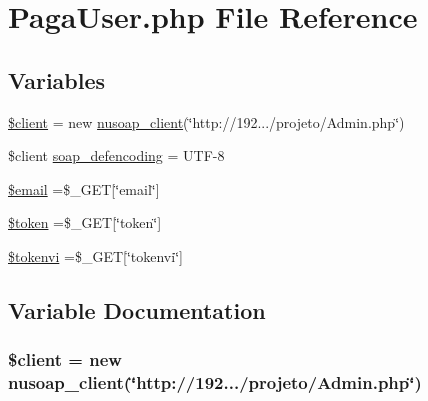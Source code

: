 \hypertarget{_paga_user_8php}{}\section{Paga\+User.\+php File Reference}
\label{_paga_user_8php}
\subsection*{Variables}
\begin{DoxyCompactItemize}
\item 
\hyperlink{_paga_user_8php_ad1405dc1ba2e288764378e79bff7a87d}{\$client} = new \hyperlink{classnusoap__client}{nusoap\+\_\+client}(\char`\"{}http\+://192.../projeto/Admin.\+php\char`\"{})
\item 
\$client \hyperlink{_paga_user_8php_a944cce1b9c1aa5e93c77ace20ce99989}{soap\+\_\+defencoding} = \textquotesingle{}U\+T\+F-\/8\textquotesingle{}
\item 
\hyperlink{_paga_user_8php_ad634f418b20382e2802f80532d76d3cd}{\$email} =\$\+\_\+\+G\+E\+T\mbox{[}\char`\"{}email\char`\"{}\mbox{]}
\item 
\hyperlink{_paga_user_8php_a00ae4fcafb1145f5e968bdf920f83e2e}{\$token} =\$\+\_\+\+G\+E\+T\mbox{[}\char`\"{}token\char`\"{}\mbox{]}
\item 
\hyperlink{_paga_user_8php_acb5a04c8a6d8f4386443a807487a9916}{\$tokenvi} =\$\+\_\+\+G\+E\+T\mbox{[}\char`\"{}tokenvi\char`\"{}\mbox{]}
\end{DoxyCompactItemize}


\subsection{Variable Documentation}
\hypertarget{_paga_user_8php_ad1405dc1ba2e288764378e79bff7a87d}{}
\subsubsection[{\$client}]{\setlength{\rightskip}{0pt plus 5cm}\$client = new {\bf nusoap\+\_\+client}(\char`\"{}http\+://192.../projeto/Admin.\+php\char`\"{})}\label{_paga_user_8php_ad1405dc1ba2e288764378e79bff7a87d}
\hypertarget{_paga_user_8php_ad634f418b20382e2802f80532d76d3cd}{}
